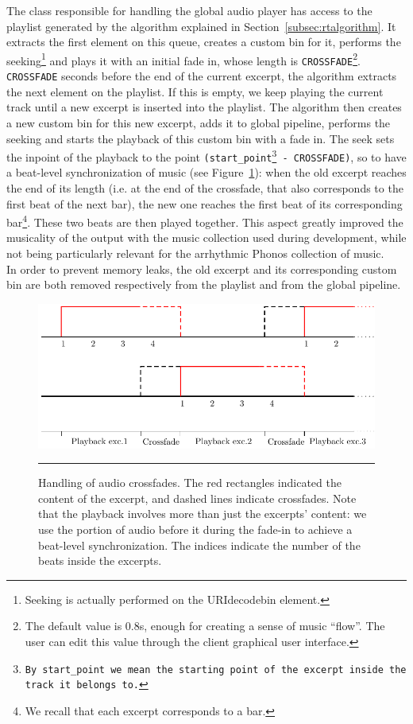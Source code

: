 The class responsible for handling the global audio player has access to the playlist generated by the algorithm explained in Section~\ref{subsec:rtalgorithm}. It extracts the first element on this queue, creates a custom bin for it, performs the seeking\footnote{Seeking is actually performed on the URIdecodebin element.} and plays it with an initial fade in, whose length is \texttt{CROSSFADE}\footnote{The default value is 0.8s, enough for creating a sense of music ``flow''. The user can edit this value through the client graphical user interface.}. \texttt{CROSSFADE} seconds before the end of the current excerpt, the algorithm extracts the next element on the playlist. If this is empty, we keep playing the current track until a new excerpt is inserted into the playlist. The algorithm then creates a new custom bin for this new excerpt, adds it to global pipeline, performs the seeking and starts the playback of this custom bin with a fade in. The seek sets the inpoint of the playback to the point \texttt{(start\_point\footnote{By \texttt{start\_point} we mean the starting point of the excerpt inside the track it belongs to.} - CROSSFADE)}, so to have a beat-level synchronization of music (see Figure~\ref{fig:crossfade}): when the old excerpt reaches the end of its length (i.e. at the end of the crossfade, that also corresponds to the first beat of the next bar), the new one reaches the first beat of its corresponding bar\footnote{We recall that each excerpt corresponds to a bar.}. These two beats are then played together. This aspect greatly improved the musicality of the output with the music collection used during development, while not being particularly relevant for the arrhythmic
 Phonos collection of music.\\
In order to prevent memory leaks, the old excerpt and its corresponding custom bin are both removed respectively from the playlist and from the global pipeline.\\
\begin{figure}[h]
\begin{center}
\includegraphics[scale=1]{Figures/crossfade.pdf}
    \rule{27em}{0.5pt}
  \caption[Audio crossfade]{Handling of audio crossfades. The red rectangles indicated the content of the excerpt, and dashed lines indicate crossfades. Note that the playback involves more than just the excerpts' content: we use the portion of audio before it during the fade-in to achieve a beat-level synchronization. The indices indicate the number of the beats inside the excerpts.}
  \label{fig:crossfade}
\end{center}
\end{figure}

